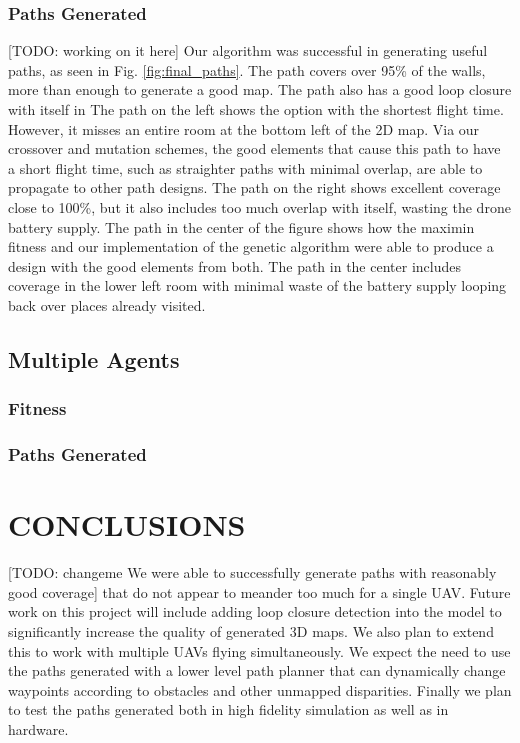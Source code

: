 \documentclass[letterpaper, 10 pt, conference]{ieeeconf}  %
\newcommand{\todo}[1]{{\color{blue}[TODO: #1]}}
\begin{document}
\subsubsection{Paths Generated}
\todo{working on it here}
Our algorithm was successful in generating useful paths, as seen in Fig. \ref{fig:final_paths}. The path covers over 95\% of the walls, more than enough to generate a good map. The path also has a good loop closure with itself in The path on the left shows the option with the shortest flight time. However, it misses an entire room at the bottom left of the 2D map. Via our crossover and mutation schemes, the good elements that cause this path to have a short flight time, such as straighter paths with minimal overlap, are able to propagate to other path designs. The path on the right shows excellent coverage close to 100\%, but it also includes too much overlap with itself, wasting the drone battery supply. The path in the center of the figure shows how the maximin fitness and our implementation of the genetic algorithm were able to produce a design with the good elements from both. The path in the center includes coverage in the lower left room with minimal waste of the battery supply looping back over places already visited.


\subsection{Multiple Agents}
\subsubsection{Fitness}
\subsubsection{Paths Generated}
\section{CONCLUSIONS}\label{conclusions}

\todo{changeme We were able to successfully generate paths with reasonably good coverage} that do not appear to meander too much for a single UAV. Future work on this project will include adding loop closure detection into the model to significantly increase the quality of generated 3D maps. We also plan to extend this to work with multiple UAVs flying simultaneously. We expect the need to use the paths generated with a lower level path planner that can dynamically change waypoints according to obstacles and other unmapped disparities. Finally we plan to test the paths generated both in high fidelity simulation as well as in hardware.



\end{document}
